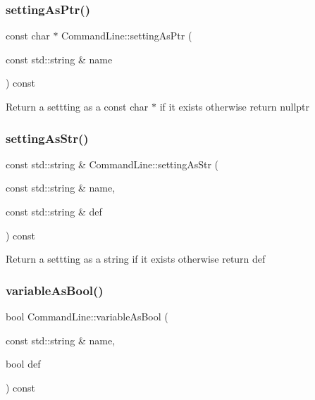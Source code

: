 \subsubsection{\texorpdfstring{setting\+As\+Ptr()}{settingAsPtr()}}
{\footnotesize\ttfamily const char $\ast$ Command\+Line\+::setting\+As\+Ptr (\begin{DoxyParamCaption}\item[{const std\+::string \&}]{name }\end{DoxyParamCaption}) const\hspace{0.3cm}{\ttfamily [noexcept]}}

Return a settting as a const char $\ast$ if it exists otherwise return nullptr \mbox{\label{classtheoria_1_1util_1_1CommandLine_ac398ce852930a3974f9ed6a1c5255975}} 
\subsubsection{\texorpdfstring{setting\+As\+Str()}{settingAsStr()}}
{\footnotesize\ttfamily const std\+::string \& Command\+Line\+::setting\+As\+Str (\begin{DoxyParamCaption}\item[{const std\+::string \&}]{name,  }\item[{const std\+::string \&}]{def }\end{DoxyParamCaption}) const}

Return a settting as a string if it exists otherwise return def \mbox{\label{classtheoria_1_1util_1_1CommandLine_a6d4d9be7adcf9ac15a1e5469535e97e9}} 
\subsubsection{\texorpdfstring{variable\+As\+Bool()}{variableAsBool()}}
{\footnotesize\ttfamily bool Command\+Line\+::variable\+As\+Bool (\begin{DoxyParamCaption}\item[{const std\+::string \&}]{name,  }\item[{bool}]{def }\end{DoxyParamCaption}) const}

